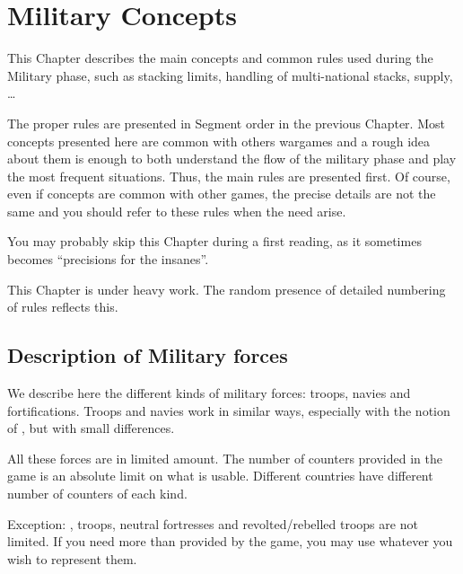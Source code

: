 
\chapter{Military Concepts}\label{chapter:MilitaryConcepts}

\begin{designnote}
  This Chapter describes the main concepts and common rules used
  during the Military phase, such as stacking limits, handling of
  multi-national stacks, supply, \ldots

  The proper rules are presented in Segment order in the previous
  Chapter. Most concepts presented here are common with others wargames and a
  rough idea about them is enough to both understand the flow of the military
  phase and play the most frequent situations. Thus, the main rules are
  presented first. Of course, even if concepts are common with other games,
  the precise details are not the same and you should refer to these rules
  when the need arise.

  You may probably skip this Chapter during a first reading, as it sometimes
  becomes ``precisions for the insanes''.
\end{designnote}

\begin{todo}
  This Chapter is under heavy work. The random presence of detailed numbering
  of rules reflects this.
\end{todo}

\section{Description of Military forces}
\label{chMilitary:Description of Military forces}
We describe here the different kinds of military forces: troops, navies and
fortifications. Troops and navies work in similar ways, especially with the
notion of , but with small differences.

All these forces are in limited amount. The number of counters provided in the
game is an absolute limit on what is usable. Different countries have
different number of counters of each kind.

Exception:  \corsaire,  troops, neutral fortresses
and revolted/rebelled troops are not limited. If you need more than provided
by the game, you may use whatever you wish to represent them.



